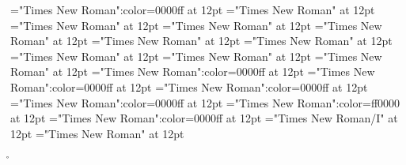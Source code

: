 \font\exampleusefirstoftypelastoftypesensearticlesectionletter="Times New Roman":color=0000ff at 12pt
\font\lastoftypevariantinflectionarticlesectionletter="Times New Roman" at 12pt
\font\variantinflectionarticlesectionletter="Times New Roman" at 12pt
\font\firstoftypevariantinflectionarticlesectionletter="Times New Roman" at 12pt
\font\firstoftypelastoftypestressfirstoftypelastoftypepronunciationarticlesectionletter="Times New Roman" at 12pt
\font\firstoftypelastoftypepronunciationarticlesectionletter="Times New Roman" at 12pt
\font\firstoftypeheadwordlastoftypearticlesectionletter="Times New Roman" at 12pt
\font\examplefirstoftypelastoftypesubentryarticlesectionletter="Times New Roman" at 12pt
\font\firstoftypeheadwordlastoftypefirstoftypelastoftypesubentryarticlesectionletter="Times New Roman" at 12pt
\font\firstoftypelastoftypesubentryarticlesectionletter="Times New Roman" at 12pt
\font\examplesensearticlesectionletter="Times New Roman":color=0000ff at 12pt
\font\firstoftypelastoftypewordusedefinitionfirstoftypelastoftypesensearticlesectionletter="Times New Roman":color=0000ff at 12pt
\font{}="Times New Roman":color=0000ff at 12pt
\font\firstoftypegrammarcategorylastoftypesensearticlesectionletter="Times New Roman":color=0000ff at 12pt
\font\sensebeforearticlesectionletter="Times New Roman":color=ff0000 at 12pt
\font\sensearticlesectionletter="Times New Roman":color=0000ff at 12pt
\font\articlesectionletter="Times New Roman/I" at 12pt
\font\sectionletter="Times New Roman" at 12pt
 \r\n
